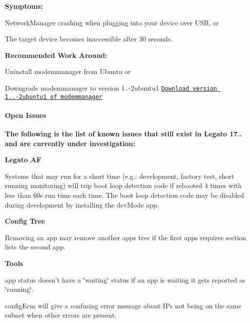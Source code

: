 {\bfseries {\bfseries Symptoms\+:} 
\begin{DoxyItemize}
\item Network\+Manager crashing when plugging into your device over U\+SB, or
\item The target device becomes inaccessible after 30 seconds.
\end{DoxyItemize}}

{\bfseries {\bfseries Recommended} {\bfseries Work} {\bfseries Around\+:} 
\begin{DoxyItemize}
\item Uninstall {\ttfamily modemmanager} from Ubuntu or
\item Downgrade {\ttfamily modemmanager} to version 1..-\/2ubuntu1 \href{http://packages.ubuntu.com/trusty/modemmanager}{\tt Download version 1..-\/2ubuntu1 of modemmanager}
\end{DoxyItemize}}

{\bfseries }\hypertarget{releaseNotes17081_rn1708_OpenIssues}{}\paragraph{Open Issues}\label{releaseNotes17081_rn1708_OpenIssues}
{\bfseries  The following is the list of known issues that still exist in Legato 17.. and are currently under investigation\+:}

{\bfseries {\bfseries Legato} {\bfseries AF} 
\begin{DoxyItemize}
\item Systems that may run for a short time (e.\+g.\+: development, factory test, short running monitoring) will trip boot loop detection code if rebooted 4 times with less than 60s run time each time. The boot loop detection code may be disabled during development by installing the dev\+Mode app.
\end{DoxyItemize}}

{\bfseries {\bfseries Config} {\bfseries Tree} 
\begin{DoxyItemize}
\item Removing an {\ttfamily app} may remove another {\ttfamily apps} tree if the first {\ttfamily apps} requires section lists the second {\ttfamily app}.
\end{DoxyItemize}}

{\bfseries {\bfseries Tools} 
\begin{DoxyItemize}
\item {\ttfamily app} {\ttfamily status} doesn’t have a \char`\"{}waiting\char`\"{} status if an app is waiting it gets reported as \char`\"{}running\char`\"{}.
\item {\ttfamily config\+Ecm} will give a confusing error message about IP\textquotesingle{}s not being on the same subnet when other errors are present.
\end{DoxyItemize}}


